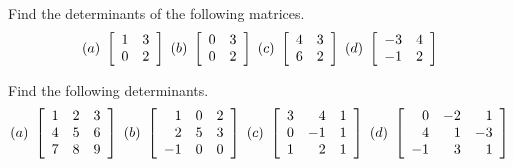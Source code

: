 \documentclass{ximera}
\begin{document}
\begin{example} 
Find the determinants of the following matrices.
  \begin{equation*}
    (a)~\startmat{rr}
      1 & 3 \\
      0 & 2
    \stopmat
    \quad
    (b)~\startmat{rr}
      0 & 3 \\
      0 & 2
    \stopmat
    \quad
    (c)~\startmat{rr}
      4 & 3 \\
      6 & 2
    \stopmat
    \quad
    (d)~\startmat{rr}
      -3 & 4 \\
      -1 & 2
    \stopmat
  \end{equation*}
\end{example}


\begin{example}
  Find the following determinants.
  \begin{equation*}
    (a)~\startmat{rrr}
      1 & 2 & 3 \\
      4 & 5 & 6 \\
      7 & 8 & 9 \\
    \stopmat
    \quad
    (b)~\startmat{rrr}
      1  & 0 & 2 \\
      2  & 5 & 3 \\
      -1 & 0 & 0 \\
    \stopmat
    \quad
    (c)~\startmat{rrr}
      3 &  4 & 1 \\
      0 & -1 & 1 \\
      1 &  2 & 1 \\
    \stopmat
    \quad
    (d)~\startmat{rrr}
      0  & -2 &  1 \\
      4  & 1  & -3 \\
      -1 & 3  &  1 \\
    \stopmat
  \end{equation*}
\end{example}
\end{document}

